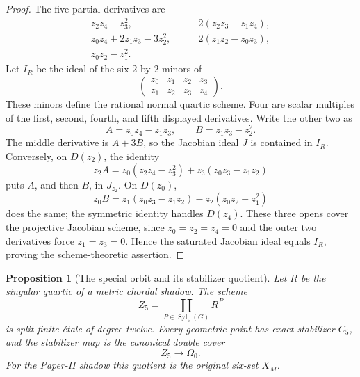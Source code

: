 \documentclass[11pt]{article}
\newtheorem{proposition}[theorem]{Proposition}
\theoremstyle{definition}
\theoremstyle{remark}
\begin{document}
\begin{proof}
The five partial derivatives are
\[
\begin{split}
 z_2z_4-z_3^2,&\qquad 2(z_2z_3-z_1z_4),\\
 z_0z_4+2z_1z_3-3z_2^2,&\qquad 2(z_1z_2-z_0z_3),\\
 z_0z_2-z_1^2.&
\end{split}
\]
Let \(I_R\) be the ideal of the six \(2\)-by-\(2\) minors of
\[
 \begin{pmatrix}z_0&z_1&z_2&z_3\\z_1&z_2&z_3&z_4\end{pmatrix}.
\]
These minors define the rational normal quartic scheme.  Four are scalar
multiples of the first, second, fourth, and fifth displayed derivatives.
Write the other two as
\[
 A=z_0z_4-z_1z_3,\qquad B=z_1z_3-z_2^2.
\]
The middle derivative is \(A+3B\), so the Jacobian ideal \(J\) is contained
in \(I_R\).  Conversely, on \(D(z_2)\), the identity
\[
 z_2A=z_0(z_2z_4-z_3^2)+z_3(z_0z_3-z_1z_2)
\]
puts \(A\), and then \(B\), in \(J_{z_2}\).  On \(D(z_0)\),
\[
 z_0B=z_1(z_0z_3-z_1z_2)-z_2(z_0z_2-z_1^2)
\]
does the same; the symmetric identity handles \(D(z_4)\).  These three
opens cover the projective Jacobian scheme, since \(z_0=z_2=z_4=0\) and the
outer two derivatives force \(z_1=z_3=0\).  Hence the saturated Jacobian
ideal equals \(I_R\), proving the scheme-theoretic assertion.
\end{proof}

\begin{proposition}[The special orbit and its stabilizer quotient]
\label{prop:special-orbit}
Let \(R\) be the singular quartic of a metric chordal shadow.  The scheme
\[
 Z_5=\coprod_{P\in\operatorname{Syl}_5(G)}R^P
\]
is split finite étale of degree twelve.  Every geometric point has exact
stabilizer \(C_5\), and the stabilizer map is the canonical double cover
\[
                 Z_5\longrightarrow\Omega_0.
\]
For the Paper-II shadow this quotient is the original six-set \(X_M\).
\end{proposition}
\end{document}
